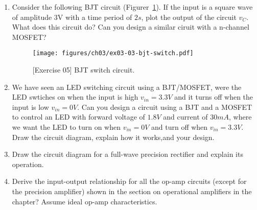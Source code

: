 \begin{enumerate}
    \item Consider the following BJT circuit (Figurer~\ref{fig:ex03-03}). If the input is a square wave of amplitude 3V with a time period of $2s$, plot the output of the circuit $v_C$. What does this circuit do? Can you design a similar ciruit with a n-channel MOSFET?
    \begin{figure}[htbp]
        \centering
        \texttt{[image: figures/ch03/ex03-03-bjt-switch.pdf]}
        \caption{[Exercise 05] BJT switch circuit.}
        \label{fig:ex03-03}
    \end{figure}

    \item We have seen an LED switching circuit using a BJT/MOSFET, were the LED swtiches on when the input is high $v_{in} = 3.3V$ and it turns off when the input is low $v_{in} = 0V$. Can you design a circuit using a BJT and a MOSFET to control an LED with forward voltage of $1.8V$ and current of $30mA$, where we want the LED to turn on when $v_{in} = 0V$ and turn off when $v_{in} = 3.3V$. Draw the circuit diagram, explain how it works,and your design.
    
    \item Draw the circuit diagram for a full-wave precision rectifier and explain its operation.
    
    \item Derive the input-output relationship for all the op-amp circuits (except for the precision amplifier) shown in the section on operational amplifiers in the chapter? Assume ideal op-amp characteristics.
\end{enumerate}